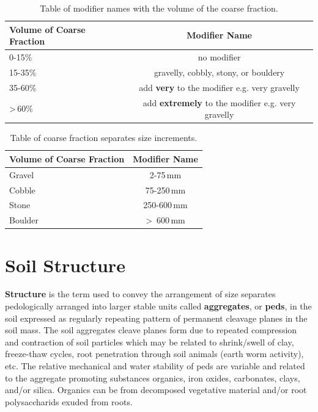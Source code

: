 \documentclass[a5paper]{book}
\begin{document}
\begin{table}[!htbp]
\label{tab:coarsefractionvolume}
\centering
\caption{Table of modifier names with the volume of the coarse fraction.}
\begin{tabular}{|l|c|}
\hline
Volume of Coarse Fraction           &  Modifier Name\\
\hline \hline
0-15\%      & no modifier\\
15-35\%     & gravelly, cobbly, stony, or bouldery\\
35-60\%     & add \textbf{very} to the modifier e.g. very gravelly\\
\textgreater\,60\%      & add \textbf{extremely} to the modifier e.g. very gravelly\\
\hline
\end{tabular}
\end{table}
    
\begin{table}[!htbp]
\label{tab:coarsefractionsizenames}
\centering
\caption{Table of coarse fraction separates size increments.}
\begin{tabular}{|l|c|}
\hline
Volume of Coarse Fraction           &  Modifier Name\\
\hline \hline
Gravel      & 2-75\,mm \\
Cobble      & 75-250\,mm \\
Stone       & 250-600\,mm \\
Boulder     & \textgreater\, 600\,mm \\
\hline
\end{tabular}
\end{table}
    
\section{Soil Structure}
    
\textbf{Structure} is the term used to convey the arrangement of size separates pedologically arranged into larger stable units called \textbf{aggregates}, or \textbf{peds}, in the soil expressed as regularly repeating pattern of permanent cleavage planes in the soil mass. The soil aggregates cleave planes form due to repeated compression and contraction of soil particles which may be related to shrink/swell of clay, freeze-thaw cycles, root penetration through soil animals (earth worm activity), etc. The relative mechanical and water stability of peds are variable and related to the aggregate promoting substances organics, iron oxides, carbonates, clays, and/or silica. Organics can be from decomposed vegetative material and/or root polysaccharids exuded from roots.
    
\end{document}
